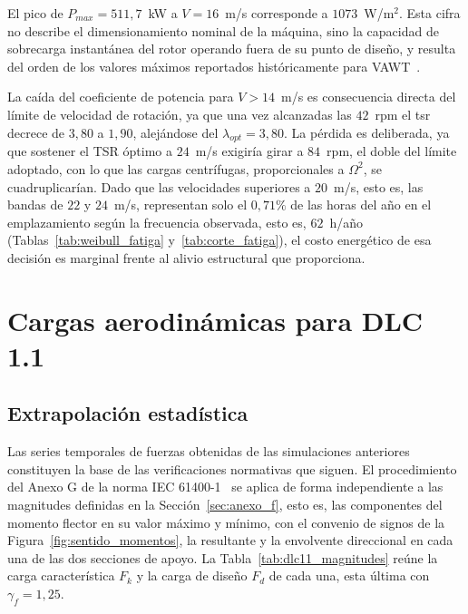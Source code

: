 El pico de $P_{max} = 511{,}7$~kW a $V = 16$~m/s corresponde a $1073$~W/m$^2$. Esta cifra no describe el dimensionamiento nominal de la máquina, sino la capacidad de sobrecarga instantánea del rotor operando fuera de su punto de diseño, y resulta del orden de los valores máximos reportados históricamente para VAWT~\parencite{Mollerstrom2019}.

La caída del coeficiente de potencia para $V > 14$~m/s es consecuencia directa del límite de velocidad de rotación, ya que una vez alcanzadas las $42$~rpm el \gls{tsr} decrece de $3{,}80$ a $1{,}90$, alejándose del $\lambda_{opt} = 3{,}80$. La pérdida es deliberada, ya que sostener el TSR óptimo a $24$~m/s exigiría girar a $84$~rpm, el doble del límite adoptado, con lo que las cargas centrífugas, proporcionales a $\Omega^2$, se cuadruplicarían. Dado que las velocidades superiores a $20$~m/s, esto es, las bandas de $22$ y $24$~m/s, representan solo el $0{,}71\%$ de las horas del año en el emplazamiento según la frecuencia observada, esto es, $62$~h/año (Tablas~\ref{tab:weibull_fatiga} y~\ref{tab:corte_fatiga}), el costo energético de esa decisión es marginal frente al alivio estructural que proporciona.

\section{Cargas aerodinámicas para DLC 1.1}
\label{sec:resultados_uls}

\subsection{Extrapolación estadística}

Las series temporales de fuerzas obtenidas de las simulaciones anteriores constituyen la base de las verificaciones normativas que siguen. El procedimiento del Anexo G de la norma IEC 61400-1~\parencite*{IEC61400-1} se aplica de forma independiente a las magnitudes definidas en la Sección~\ref{sec:anexo_f}, esto es, las componentes del momento flector en su valor máximo y mínimo, con el convenio de signos de la Figura~\ref{fig:sentido_momentos}, la resultante y la envolvente direccional en cada una de las dos secciones de apoyo. La Tabla~\ref{tab:dlc11_magnitudes} reúne la carga característica $F_k$ y la carga de diseño $F_d$ de cada una, esta última con $\gamma_f = 1{,}25$.

